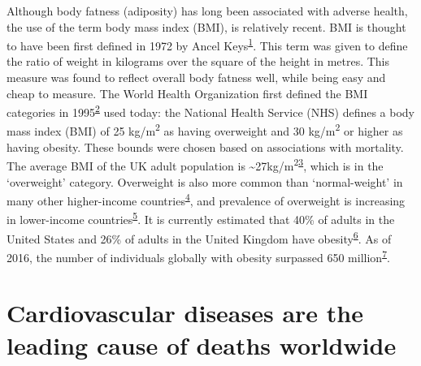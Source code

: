 \documentclass[11pt,twoside]{bristolthesis}
\begin{document}
Although body fatness (adiposity) has long been associated with adverse health, the use of the term body mass index (BMI), is relatively recent. BMI is thought to have been first defined in 1972 by Ancel Keys\textsuperscript{\protect\hyperlink{ref-Blackburn2014}{1}}. This term was given to define the ratio of weight in kilograms over the square of the height in metres. This measure was found to reflect overall body fatness well, while being easy and cheap to measure. The World Health Organization first defined the BMI categories in 1995\textsuperscript{\protect\hyperlink{ref-WHO1995}{2}} used today: the National Health Service (NHS) defines a body mass index (BMI) of 25 kg/m\textsuperscript{2} as having overweight and 30 kg/m\textsuperscript{2} or higher as having obesity. These bounds were chosen based on associations with mortality. The average BMI of the UK adult population is \textasciitilde27kg/m\textsuperscript{2}\textsuperscript{\protect\hyperlink{ref-Wade2018}{3}}, which is in the `overweight' category. Overweight is also more common than `normal-weight' in many other higher-income countries\textsuperscript{\protect\hyperlink{ref-NCD-RisC2016}{4}}, and prevalence of overweight is increasing in lower-income countries\textsuperscript{\protect\hyperlink{ref-Templin2019}{5}}. It is currently estimated that 40\% of adults in the United States and 26\% of adults in the United Kingdom have obesity\textsuperscript{\protect\hyperlink{ref-Bluher2019}{6}}. As of 2016, the number of individuals globally with obesity surpassed 650 million\textsuperscript{\protect\hyperlink{ref-TheLancetPublicHealth2018}{7}}.

\hypertarget{CVD-stats}{%
\section{Cardiovascular diseases are the leading cause of deaths worldwide}\label{CVD-stats}}
\end{document}
